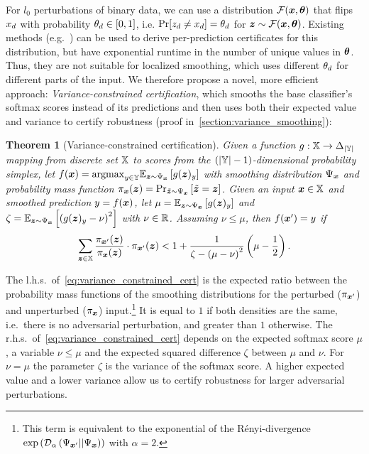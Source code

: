 \documentclass{article} %
\theoremstyle{plain}
\newtheorem{theorem}{Theorem}[section]
\theoremstyle{definition}
\theoremstyle{remark}
\begin{document}
For $l_0$ perturbations of binary data, we can use a distribution $\mathcal{F}({\bm{x}}, {\bm{\theta}})$ that  flips ${x}_d$ with probability ${\theta}_d \in [0,1]$, i.e. $\Pr[{z}_d \neq {x}_d ] = {\theta}_d$ for ${\bm{z}} \sim \mathcal{F}({\bm{x}}, {\bm{\theta}})$.
Existing methods (e.g.~\citep{Lee2019}) can be used to derive per-prediction certificates for this distribution, but have  exponential runtime in the number of unique values in ${\bm{\theta}}$.
Thus, they are not suitable for localized smoothing, which uses different ${\theta}_d$ for different parts of the input.
We therefore propose a novel, more efficient approach: \textit{Variance-constrained certification},
which smooths the base classifier's softmax scores instead of its predictions and then uses both their expected value and variance to certify robustness 
(proof in~\autoref{section:variance_smoothing}):
\begin{theorem}[Variance-constrained certification]\label{theorem:variance_constrained_cert}
	Given a function $g : {\mathbb{X}} \rightarrow \Delta_{|{\mathbb{Y}}|}$ mapping from discrete set ${\mathbb{X}}$ to scores from the $\left(|{\mathbb{Y}}| -1\right)$-dimensional probability simplex, let 
	$f({\bm{x}}) = \mathrm{argmax}_{y \in {\mathbb{Y}}}
	\mathbb{E}_{{\bm{z}} \sim \Psi_{\bm{x}}}
	\left[g({\bm{z}})_y\right]$ with smoothing distribution $\Psi_{\bm{x}}$ and probability mass function
	$\pi_{{\bm{x}}}({\bm{z}}) = \Pr_{\tilde{{\bm{z}}} \sim \Psi_{\bm{x}}}\left[\tilde{{\bm{z}}} = {\bm{z}}\right]$.
	Given an input ${\bm{x}} \in {\mathbb{X}}$ and smoothed prediction ${y} = f({\bm{x}})$, 
	let $\mu = \mathbb{E}_{{\bm{z}} \sim \Psi_{\bm{x}}}\left[g({\bm{z}})_y\right]$
	and $\zeta = \mathbb{E}_{{\bm{z}} \sim \Psi_{\bm{x}}}\left[\left(g({\bm{z}})_y - \nu \right)^2\right]$ with $\nu \in {\mathbb{R}}$.
	Assuming $\nu \leq \mu$, then $f({\bm{x}}') = y$ if 
	\begin{equation}\label{eq:variance_constrained_cert}
		\sum_{{\bm{z}} \in {\mathbb{X}}} \frac{\pi_{{\bm{x}}'}({\bm{z}})}{\pi_{{\bm{x}}}({\bm{z}})} \cdot \pi_{{\bm{x}}'}({\bm{z}})
		< 1 + \frac{1}{\zeta - \left(\mu - \nu  \right)^2} \left(\mu - \frac{1}{2}\right).
	\end{equation}
\end{theorem}
The l.h.s.\ of~\autoref{eq:variance_constrained_cert} is the expected ratio between the probability mass functions of the smoothing distributions for the perturbed ($\pi_{{\bm{x}}'}$) and unperturbed ($\pi_{\bm{x}}$) input.\footnote{{This term is equivalent to the exponential of the R\'enyi-divergence
$\exp\left(\mathcal{D}_\alpha\left(\Psi_{{\bm{x}}'} || \Psi_{\bm{x}}\right)\right)$
with $\alpha=2$.}}
It is equal to $1$ if both densities are the same, i.e.\ there is no adversarial perturbation, and greater than $1$ otherwise.
The r.h.s.\ of~\autoref{eq:variance_constrained_cert} depends on 
the expected softmax score $\mu$, a variable $\nu \leq \mu$ and the expected squared difference $\zeta$ between $\mu$ and $\nu$.
For $\nu = \mu$ the parameter $\zeta$ is the variance of the softmax score.
A higher expected value and a lower variance allow us to certify robustness for larger adversarial perturbations.
\end{document}
